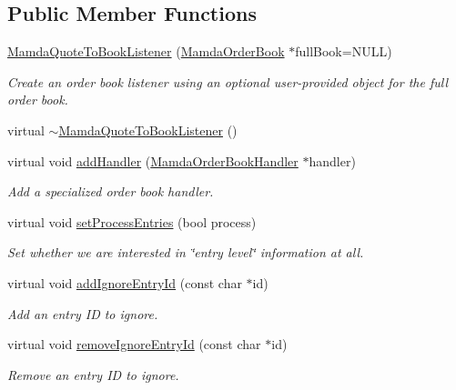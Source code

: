 \subsection*{Public Member Functions}
\begin{CompactItemize}
\item 
\hyperlink{classMamdaQuoteToBookListener_9c2fa5fd474cd175f54db508a4ae055c}{Mamda\-Quote\-To\-Book\-Listener} (\hyperlink{classWombat_1_1MamdaOrderBook}{Mamda\-Order\-Book} $\ast$full\-Book=NULL)
\begin{CompactList}\small\item\em Create an order book listener using an optional user-provided object for the full order book. \item\end{CompactList}\item 
virtual \hyperlink{classMamdaQuoteToBookListener_8b24434d592b082f17d07c002bd80625}{$\sim$Mamda\-Quote\-To\-Book\-Listener} ()
\item 
virtual void \hyperlink{classMamdaQuoteToBookListener_f789fd04752b2c25b04daa6888c33388}{add\-Handler} (\hyperlink{classWombat_1_1MamdaOrderBookHandler}{Mamda\-Order\-Book\-Handler} $\ast$handler)
\begin{CompactList}\small\item\em Add a specialized order book handler. \item\end{CompactList}\item 
virtual void \hyperlink{classMamdaQuoteToBookListener_21f81f9500c986f88ea910b97f086b39}{set\-Process\-Entries} (bool process)
\begin{CompactList}\small\item\em Set whether we are interested in \char`\"{}entry level\char`\"{} information at all. \item\end{CompactList}\item 
virtual void \hyperlink{classMamdaQuoteToBookListener_fbd741a8aff801ccb953cf7e5056a359}{add\-Ignore\-Entry\-Id} (const char $\ast$id)
\begin{CompactList}\small\item\em Add an entry ID to ignore. \item\end{CompactList}\item 
virtual void \hyperlink{classMamdaQuoteToBookListener_e16ce5ea6ee98985543df7c93cea61f9}{remove\-Ignore\-Entry\-Id} (const char $\ast$id)
\begin{CompactList}\small\item\em Remove an entry ID to ignore. \item\end{CompactList}\item 

\end{CompactItemize}
